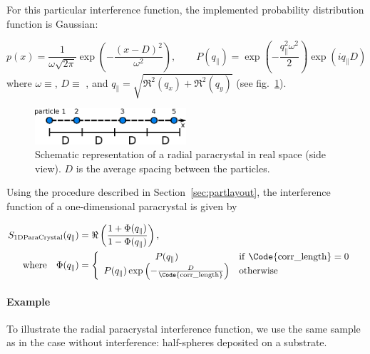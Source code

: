 For this particular interference function, the implemented probability distribution function is Gaussian:

\begin{equation*}
p(x)=\frac{1}{\omega \sqrt{2\pi}} \exp\left(-\dfrac{(x-D)^2}{\omega^2}\right),\qquad P(q_{\parallel})=\exp\left(-\frac{q_{\parallel}^2 \omega^2}{2}\right)\exp(iq_{\parallel}D)
\end{equation*}
where $\omega\equiv$, $D\equiv$ , and $q_{\parallel}=\sqrt{\Re^2(q_x) + \Re^2(q_y)}$ (see fig.~\ref{fig:1dpara}).

\begin{figure}[ht]
\begin{center}
\includegraphics[width=0.5\textwidth]{Figures/1Dparacrystal}
\end{center}
\caption{Schematic representation of a radial paracrystal in real space (side view). $D$ is the average spacing between the particles.}
\label{fig:1dpara}
\end{figure}

Using the procedure described in Section~\ref{sec:partlayout}, the interference function of a one-dimensional paracrystal is given by

\begin{align*}
S_{\mathrm{1DParaCrystal}}(q_{\parallel}) &=\Re \left(\frac{1+\Phi(q_{\parallel}) }{1 - \Phi(q_{\parallel})} \right), \\
\mathrm{where}\quad \Phi(q_{\parallel}) &= \left\{
\begin{array}{c l}     
    P(q_{\parallel}) & \mathrm{if\ \Code{corr\_length}}=0\\
    P(q_{\parallel})\exp\left(-\frac{D}{\mathrm{\Code{corr\_length}}}\right) & \mathrm{otherwise}
\end{array}\right.&
\end{align*}

\paragraph{Example}
To illustrate the radial paracrystal interference function, we use the same sample as in the case without interference: half-spheres deposited on a substrate.

